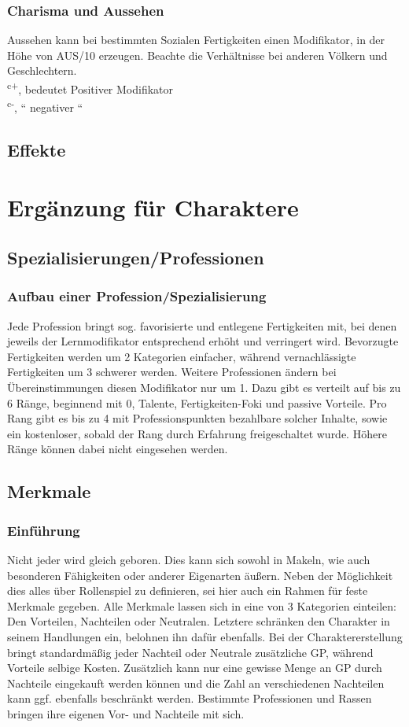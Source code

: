 \documentclass[a4paper,12pt,oneside]{book}
\begin{document}
\section{Charisma und Aussehen}
Aussehen kann bei bestimmten Sozialen Fertigkeiten einen Modifikator, in der Höhe von AUS/10 erzeugen. Beachte die Verhältnisse bei anderen Völkern und Geschlechtern.
\\\textsuperscript{c+}, bedeutet Positiver Modifikator
\\\textsuperscript{c-}, `` negativer ``

\chapter{Effekte}

\part{Ergänzung für Charaktere}
\setcounter{chapter}{0}
\chapter{Spezialisierungen/Professionen}
\section{Aufbau einer Profession/Spezialisierung}
Jede Profession bringt sog. favorisierte und entlegene Fertigkeiten mit, bei denen jeweils der Lernmodifikator entsprechend erhöht und verringert wird. Bevorzugte Fertigkeiten werden um 2 Kategorien einfacher, während vernachlässigte Fertigkeiten um 3 schwerer werden. Weitere Professionen ändern bei Übereinstimmungen diesen Modifikator nur um 1.
Dazu gibt es verteilt auf bis zu 6 Ränge, beginnend mit 0, Talente, Fertigkeiten-Foki und passive Vorteile.
Pro Rang gibt es bis zu 4 mit Professionspunkten bezahlbare solcher Inhalte, sowie ein kostenloser, sobald der Rang durch Erfahrung freigeschaltet wurde. Höhere Ränge können dabei nicht eingesehen werden.  

\chapter{Merkmale}
\section{Einführung}
Nicht jeder wird gleich geboren. Dies kann sich sowohl in Makeln, wie auch besonderen Fähigkeiten oder anderer Eigenarten äußern. Neben der Möglichkeit dies alles über Rollenspiel zu definieren, sei hier auch ein Rahmen für feste Merkmale gegeben. Alle Merkmale lassen sich in eine von 3 Kategorien einteilen: Den Vorteilen, Nachteilen oder Neutralen. Letztere schränken den Charakter in seinem Handlungen ein, belohnen ihn dafür ebenfalls. Bei der Charaktererstellung bringt standardmäßig jeder Nachteil oder Neutrale zusätzliche GP, während Vorteile selbige Kosten. Zusätzlich kann nur eine gewisse Menge an GP durch Nachteile eingekauft werden können und die Zahl an verschiedenen Nachteilen kann ggf. ebenfalls beschränkt werden. Bestimmte Professionen und Rassen bringen ihre eigenen Vor- und Nachteile mit sich.
\end{document}
